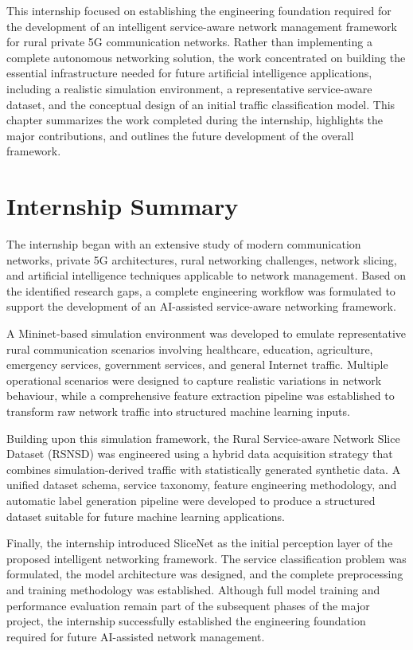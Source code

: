 \documentclass[12pt,a4paper]{report}
\begin{document}
	This internship focused on establishing the engineering foundation required for the development of an intelligent service-aware network management framework for rural private 5G communication networks. Rather than implementing a complete autonomous networking solution, the work concentrated on building the essential infrastructure needed for future artificial intelligence applications, including a realistic simulation environment, a representative service-aware dataset, and the conceptual design of an initial traffic classification model. This chapter summarizes the work completed during the internship, highlights the major contributions, and outlines the future development of the overall framework.
	
	\section{Internship Summary}
	
	The internship began with an extensive study of modern communication networks, private 5G architectures, rural networking challenges, network slicing, and artificial intelligence techniques applicable to network management. Based on the identified research gaps, a complete engineering workflow was formulated to support the development of an AI-assisted service-aware networking framework.
	
	A Mininet-based simulation environment was developed to emulate representative rural communication scenarios involving healthcare, education, agriculture, emergency services, government services, and general Internet traffic. Multiple operational scenarios were designed to capture realistic variations in network behaviour, while a comprehensive feature extraction pipeline was established to transform raw network traffic into structured machine learning inputs.
	
	Building upon this simulation framework, the Rural Service-aware Network Slice Dataset (RSNSD) was engineered using a hybrid data acquisition strategy that combines simulation-derived traffic with statistically generated synthetic data. A unified dataset schema, service taxonomy, feature engineering methodology, and automatic label generation pipeline were developed to produce a structured dataset suitable for future machine learning applications.
	
	Finally, the internship introduced SliceNet as the initial perception layer of the proposed intelligent networking framework. The service classification problem was formulated, the model architecture was designed, and the complete preprocessing and training methodology was established. Although full model training and performance evaluation remain part of the subsequent phases of the major project, the internship successfully established the engineering foundation required for future AI-assisted network management.
	
\end{document}
